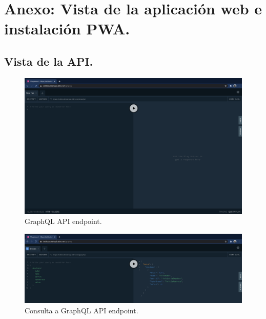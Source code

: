 \section{Anexo: Vista de la aplicación web e instalación PWA.}

\subsection{Vista de la API.}

\begin{figure}[h!]
  \centering
  \includegraphics[width=\textwidth]{imagenes/desarrollo/web/api/graphql_api}
  \caption{GraphQL API endpoint.}
  \label{fig:graphql-api}
\end{figure}

\begin{figure}[h!]
  \centering
  \includegraphics[width=\textwidth]{imagenes/desarrollo/web/api/graphql_query}
  \caption{Consulta a GraphQL API endpoint.}
  \label{fig:query-graphql-api}
\end{figure}

